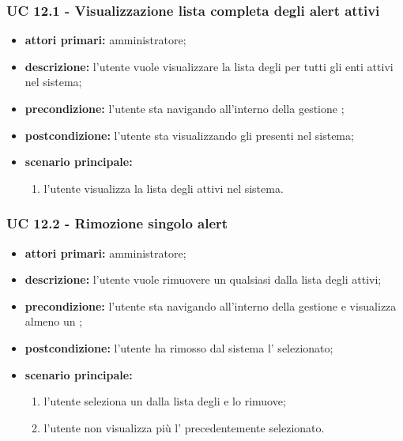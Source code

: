 		\subsubsection{UC 12.1 - Visualizzazione lista completa degli alert attivi}
		\begin{itemize}
			\item \textbf{attori primari:} amministratore;
			\item \textbf{descrizione:} l'utente vuole visualizzare la lista degli  per tutti gli enti attivi nel sistema;
			\item \textbf{precondizione:} l'utente sta navigando all'interno della gestione ;
			\item \textbf{postcondizione:} l'utente sta visualizzando gli  presenti nel sistema;
			\item \textbf{scenario principale:}
			\begin{enumerate}
				\item{l'utente visualizza la lista degli  attivi nel sistema.}
			\end{enumerate}
		\end{itemize}

		\subsubsection{UC 12.2 - Rimozione singolo alert}
		\begin{itemize}
			\item \textbf{attori primari:} amministratore;
			\item \textbf{descrizione:} l'utente vuole rimuovere un qualsiasi  dalla lista degli  attivi;
			\item \textbf{precondizione:} l'utente sta navigando all'interno della gestione  e visualizza almeno un ;
			\item \textbf{postcondizione:} l'utente ha rimosso dal sistema l' selezionato;
			\item \textbf{scenario principale:}
			\begin{enumerate}
				\item{l'utente seleziona un  dalla lista degli  e lo rimuove;}
				\item{l'utente non visualizza più l' precedentemente selezionato.}
			\end{enumerate}
		\end{itemize}
